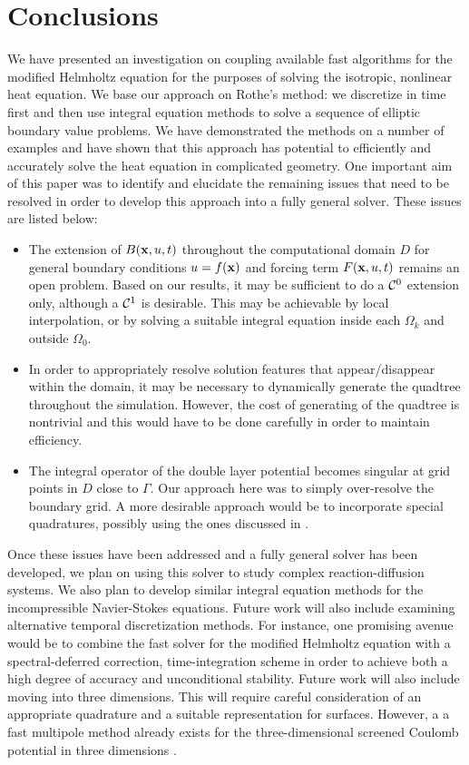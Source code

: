 \documentclass[preprint,12pt]{elsarticle}
\newcommand{\x}{{\bf x}}
\begin{document}
\section{Conclusions}
We have presented an investigation on coupling available fast algorithms for the modified Helmholtz equation for the purposes of solving the isotropic, nonlinear heat equation.  
We base our approach on Rothe's method: we discretize in time first and then use integral equation methods to solve a sequence of elliptic boundary value problems.  
We have demonstrated the methods on a number of examples and have shown that this approach has potential to efficiently and accurately solve the heat equation in complicated geometry. One important aim of this paper was to identify and elucidate the remaining issues that need to be resolved in order to develop this approach into a fully general solver.
These issues are listed below:
\begin{itemize}
\item The extension of $B(\x,u,t)$ throughout the computational domain $D$ for general boundary conditions $u = f(\x)$ and forcing term $F(\x,u,t)$ remains an open problem. Based on our results, it may be sufficient to do a ${\cal C}^0$ extension only, although a ${\cal C}^1$ is desirable. This may be achievable by local interpolation, or by solving a suitable integral equation inside each $\Omega_k$ and outside $\Omega_0$.
\item In order to appropriately resolve solution features that appear/disappear within the domain, it may be necessary to dynamically generate the quadtree throughout the simulation. However, the cost of generating of the quadtree is nontrivial and this would have to be done carefully in order to maintain efficiency. 
\item The integral operator of the double layer potential becomes singular at grid points in $D$ close to $\Gamma$. Our approach here was to simply over-resolve the boundary grid. A more desirable approach would be to incorporate special quadratures, possibly using the ones discussed in \cite{beale,strain}. 
\end{itemize}

Once these issues have been addressed and a fully general solver has been developed, we plan on using this solver to study complex reaction-diffusion systems. We also plan to develop similar integral equation methods for the incompressible Navier-Stokes equations.
Future work will also include examining alternative temporal discretization methods. 
For instance, one promising avenue would be to combine the fast solver for the modified Helmholtz equation with a spectral-deferred correction, time-integration scheme \cite{dutt,jia_huang} in order to achieve both a high degree of accuracy and unconditional stability. 
Future work will also include moving into three dimensions.  
This will require careful consideration of an appropriate quadrature and a suitable representation for surfaces. However, a a fast multipole method already exists for the three-dimensional screened Coulomb potential in three dimensions \cite{screened_coulomb}.
\end{document}
